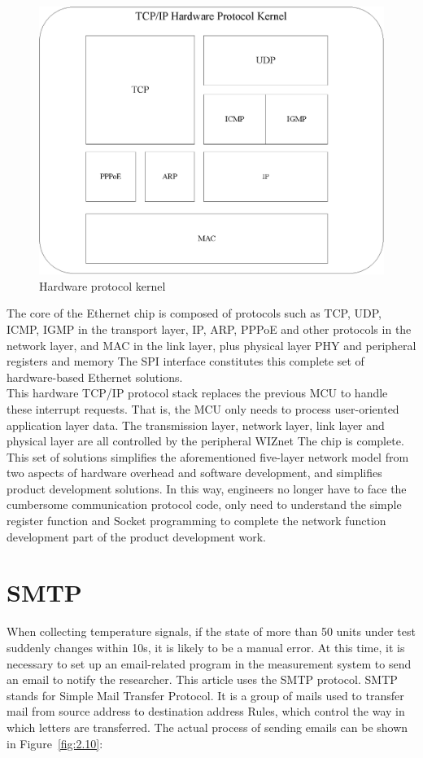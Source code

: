 \begin{figure}[!ht]
	\centering
	\includegraphics[scale=0.85]{grafiken/2.9.eps}
	\caption{Hardware protocol kernel} 
	\label{fig:2.9}
\end{figure}
\FloatBarrier
The core of the Ethernet chip is composed of protocols such as TCP, UDP, ICMP, IGMP in the transport layer, IP, ARP, PPPoE and other protocols in the network layer, and MAC in the link layer, plus physical layer PHY and peripheral registers and memory The SPI interface constitutes this complete set of hardware-based Ethernet solutions.
\\
This hardware TCP/IP protocol stack replaces the previous MCU to handle these interrupt requests. That is, the MCU only needs to process user-oriented application layer data. The transmission layer, network layer, link layer and physical layer are all controlled by the peripheral WIZnet The chip is complete. This set of solutions simplifies the aforementioned five-layer network model from two aspects of hardware overhead and software development, and simplifies product development solutions. In this way, engineers no longer have to face the cumbersome communication protocol code, only need to understand the simple register function and Socket programming to complete the network function development part of the product development work.

\section{SMTP}
\label{sec:SMTP}
When collecting temperature signals, if the state of more than 50 units under test suddenly changes within 10s, it is likely to be a manual error. At this time, it is necessary to set up an email-related program in the measurement system to send an email to notify the researcher. This article uses the SMTP protocol.
SMTP stands for Simple Mail Transfer Protocol. It is a group of mails used to transfer mail from source address to destination address
Rules, which control the way in which letters are transferred. The actual process of sending emails can be shown in Figure~\ref{fig:2.10}:
 
